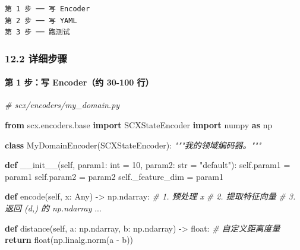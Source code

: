 \documentclass[
  12pt,
]{ctexart}
\newenvironment{Shaded}{}{}
\newcommand{\BuiltInTok}[1]{\textcolor[rgb]{0.00,0.50,0.00}{#1}}
\newcommand{\CommentTok}[1]{\textcolor[rgb]{0.38,0.63,0.69}{\textit{#1}}}
\newcommand{\ControlFlowTok}[1]{\textcolor[rgb]{0.00,0.44,0.13}{\textbf{#1}}}
\newcommand{\DecValTok}[1]{\textcolor[rgb]{0.25,0.63,0.44}{#1}}
\newcommand{\FunctionTok}[1]{\textcolor[rgb]{0.02,0.16,0.49}{#1}}
\newcommand{\ImportTok}[1]{\textcolor[rgb]{0.00,0.50,0.00}{\textbf{#1}}}
\newcommand{\KeywordTok}[1]{\textcolor[rgb]{0.00,0.44,0.13}{\textbf{#1}}}
\newcommand{\NormalTok}[1]{#1}
\newcommand{\OperatorTok}[1]{\textcolor[rgb]{0.40,0.40,0.40}{#1}}
\newcommand{\StringTok}[1]{\textcolor[rgb]{0.25,0.44,0.63}{#1}}
\newcommand{\VariableTok}[1]{\textcolor[rgb]{0.10,0.09,0.49}{#1}}
\begin{document}
\begin{verbatim}
第 1 步 ── 写 Encoder
第 2 步 ── 写 YAML
第 3 步 ── 跑测试
\end{verbatim}

\subsubsection{12.2 详细步骤}\label{ux8be6ux7ec6ux6b65ux9aa4}

\paragraph{第 1 步：写 Encoder（约 30-100
行）}\label{ux7b2c-1-ux6b65ux5199-encoderux7ea6-30-100-ux884c}

\begin{Shaded}
\begin{Highlighting}[]
\CommentTok{\# scx/encoders/my\_domain.py}

\ImportTok{from}\NormalTok{ scx.encoders.base }\ImportTok{import}\NormalTok{ SCXStateEncoder}
\ImportTok{import}\NormalTok{ numpy }\ImportTok{as}\NormalTok{ np}

\KeywordTok{class}\NormalTok{ MyDomainEncoder(SCXStateEncoder):}
    \CommentTok{"""我的领域编码器。"""}

    \KeywordTok{def} \FunctionTok{\_\_init\_\_}\NormalTok{(}\VariableTok{self}\NormalTok{, param1: }\BuiltInTok{int} \OperatorTok{=} \DecValTok{10}\NormalTok{, param2: }\BuiltInTok{str} \OperatorTok{=} \StringTok{"default"}\NormalTok{):}
        \VariableTok{self}\NormalTok{.param1 }\OperatorTok{=}\NormalTok{ param1}
        \VariableTok{self}\NormalTok{.param2 }\OperatorTok{=}\NormalTok{ param2}
        \VariableTok{self}\NormalTok{.\_feature\_dim }\OperatorTok{=}\NormalTok{ param1}

    \KeywordTok{def}\NormalTok{ encode(}\VariableTok{self}\NormalTok{, x: Any) }\OperatorTok{{-}\textgreater{}}\NormalTok{ np.ndarray:}
        \CommentTok{\# 1. 预处理 x}
        \CommentTok{\# 2. 提取特征向量}
        \CommentTok{\# 3. 返回 (d,) 的 np.ndarray}
\NormalTok{        ...}

    \KeywordTok{def}\NormalTok{ distance(}\VariableTok{self}\NormalTok{, a: np.ndarray, b: np.ndarray) }\OperatorTok{{-}\textgreater{}} \BuiltInTok{float}\NormalTok{:}
        \CommentTok{\# 自定义距离度量}
        \ControlFlowTok{return} \BuiltInTok{float}\NormalTok{(np.linalg.norm(a }\OperatorTok{{-}}\NormalTok{ b))}


\end{Highlighting}
\end{Shaded}
\end{document}
